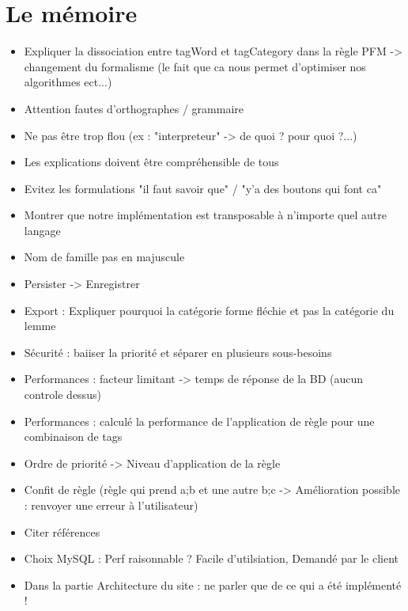 \documentclass{article}
\begin{document}
\section{Le mémoire}
\begin{itemize}
    \item Expliquer la dissociation entre tagWord et tagCategory dans la règle PFM -> changement du formalisme (le fait que ca nous permet d'optimiser nos algorithmes ect...)
    \item Attention fautes d'orthographes / grammaire
    \item Ne pas être trop flou (ex : "interpreteur" -> de quoi ? pour quoi ?...)
    \item Les explications doivent être compréhensible de tous
    \item Evitez les formulations "il faut savoir que" / "y'a des boutons qui font ca"
    \item Montrer que notre implémentation est transposable à n'importe quel autre langage
    \item Nom de famille pas en majuscule
    \item Persister -> Enregistrer
    \item Export : Expliquer pourquoi la catégorie forme fléchie et pas la catégorie du lemme
    \item Sécurité : baiiser la priorité et séparer en plusieurs sous-besoins
    \item Performances : facteur limitant -> temps de réponse de la BD (aucun controle dessus)
    \item Performances : calculé la performance de l'application de règle pour une combinaison de tags
    \item Ordre de priorité -> Niveau d'application de la règle
    \item Confit de règle (règle qui prend a;b et une autre b;c -> Amélioration possible : renvoyer une erreur à l'utilisateur)
    \item Citer références
    \item Choix MySQL : Perf raisonnable ? Facile d'utilsiation, Demandé par le client
    \item Dans la partie Architecture du site : ne parler que de ce qui a été implémenté !
\end{itemize}
\end{document}
